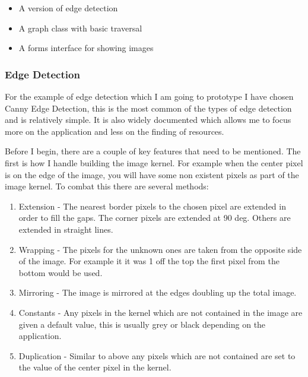 \begin{flushleft}
        \begin{itemize}
            \item A version of edge detection
            \item A graph class with basic traversal
            \item A forms interface for showing images
        \end{itemize} \bk
        

        \subsubsection{Edge Detection}
        For the example of edge detection which I am going to prototype I have chosen Canny Edge Detection, this is the most common of the types of edge detection and is relatively simple. It is also widely documented which allows me to focus more on the application and less on the finding of resources. \\ \bk

        Before I begin, there are a couple of key features that need to be mentioned. The first is how I handle building the image kernel. For example when the center pixel is on the edge of the image, you will have some non existent pixels as part of the image kernel. To combat this there are several methods:
        
        \begin{enumerate}
            \item Extension - The nearest border pixels to the chosen pixel are extended in order to fill the gaps. The corner pixels are extended at 90 deg. Others are extended in straight lines.
            \item Wrapping - The pixels for the unknown ones are taken from the opposite side of the image. For example it it was 1 off the top the first pixel from the bottom would be used.
            \item Mirroring - The image is mirrored at the edges doubling up the total image.
            \item Constants - Any pixels in the kernel which are not contained in the image are given a default value, this is usually grey or black depending on the application.
            \item Duplication - Similar to above any pixels which are not contained are set to the value of the center pixel in the kernel.
        \end{enumerate} \bk
        

\end{flushleft}

